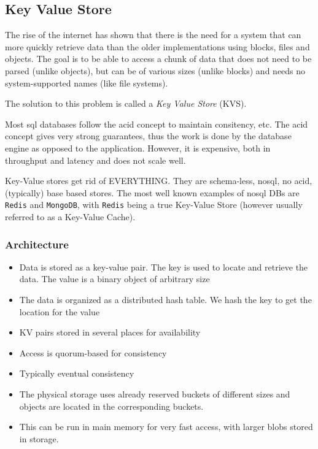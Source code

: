 \subsection{Key Value Store}
\label{sec:key-value-store}
The rise of the internet has shown that there is the need for a system that can more quickly retrieve data than the older implementations using blocks, files and objects.
The goal is to be able to access a chunk of data that does not need to be parsed (unlike objects), but can be of various sizes (unlike blocks)
and needs no system-supported names (like file systems).

The solution to this problem is called a \textit{Key Value Store} (KVS).

Most \acrshort{sql} databases follow the \acrshort{acid} concept to maintain consitency, etc.
The \acrshort{acid} concept gives very strong guarantees, thus the work is done by the database engine as opposed to the application.
However, it is expensive, both in throughput and latency and does not scale well.

Key-Value stores get rid of EVERYTHING.
They are schema-less, \acrshort{nosql}, no \acrshort{acid}, (typically) \acrshort{base} based stores.
The most well known examples of \acrshort{nosql} DBs are \texttt{Redis} and \texttt{MongoDB},
with \texttt{Redis} being a true Key-Value Store (however usually referred to as a Key-Value Cache).

\subsubsection{Architecture}
\begin{itemize}
    \item Data is stored as a key-value pair. The key is used to locate and retrieve the data. The value is a binary object of arbitrary size
    \item The data is organized as a distributed hash table. We hash the key to get the location for the value
    \item KV pairs stored in several places for availability
    \item Access is \gls{quorum}-based for consistency
    \item Typically eventual consistency
    \item The physical storage uses already reserved buckets of different sizes and objects are located in the corresponding buckets.
    \item This can be run in main memory for very fast access, with larger blobs stored in storage.
\end{itemize}


